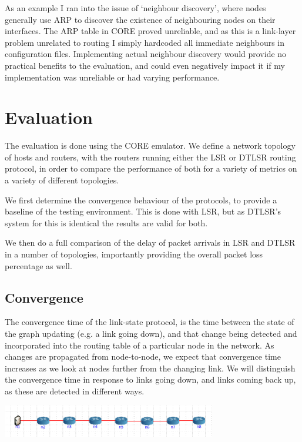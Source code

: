 \documentclass[10pt,twoside,a4paper]{article}
\begin{document}
As an example I ran into the issue of `neighbour discovery', where nodes generally use ARP to discover the existence of neighbouring nodes on their interfaces. The ARP table in CORE proved unreliable, and as this is a link-layer problem unrelated to routing I simply hardcoded all immediate neighbours in configuration files. Implementing actual neighbour discovery would provide no practical benefits to the evaluation, and could even negatively impact it if my implementation was unreliable or had varying performance.


\section{Evaluation}

The evaluation is done using the CORE emulator. We define a network topology of hosts and routers, with the routers running either the LSR or DTLSR routing protocol, in order to compare the performance of both for a variety of metrics on a variety of different topologies.

We first determine the convergence behaviour of the protocols, to provide a baseline of the testing environment. This is done with LSR, but as DTLSR's system for this is identical the results are valid for both.

We then do a full comparison of the delay of packet arrivals in LSR and DTLSR in a number of topologies, importantly providing the overall packet loss percentage as well.

\subsection{Convergence}

The convergence time of the link-state protocol, is the time between the state of the graph updating (e.g. a link going down), and that change being detected and incorporated into the routing table of a particular node in the network. As changes are propagated from node-to-node, we expect that convergence time increases as we look at nodes further from the changing link. We will distinguish the convergence time in response to links going down, and links coming back up, as these are detected in different ways.

\begin{minipage}{1\textwidth} \centering
	\includegraphics[width=0.7\textwidth]{conv_topology}
\end{minipage}
\end{document}
